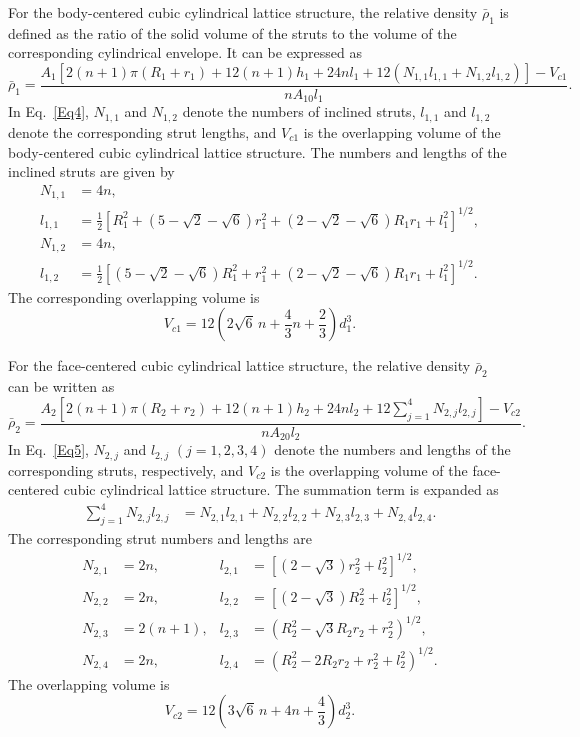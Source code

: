 \documentclass[12pt,a4paper]{article}
\begin{document}
For the body-centered cubic cylindrical lattice structure, the relative density $\bar{\rho}_1$ is defined as the ratio of the solid volume of the struts to the volume of the corresponding cylindrical envelope. It can be expressed as
%
\begin{equation}
	\bar{\rho}_1 =
	\frac{
		A_1\left[
		2(n+1)\pi(R_1+r_1)
		+12(n+1)h_1
		+24n l_1
		+12\left(N_{1,1}l_{1,1}+N_{1,2}l_{1,2}\right)
		\right]
		-V_{c1}
	}{
		nA_{10}l_1
	}.
	\label{Eq4}
\end{equation}
%
In Eq.~\eqref{Eq4}, $N_{1,1}$ and $N_{1,2}$ denote the numbers of inclined struts, $l_{1,1}$ and $l_{1,2}$ denote the corresponding strut lengths, and $V_{c1}$ is the overlapping volume of the body-centered cubic cylindrical lattice structure. The numbers and lengths of the inclined struts are given by
%
\[
\begin{aligned}
	N_{1,1} &= 4n, \\
	l_{1,1} &=
	\frac{1}{2}
	\left[
	R_1^2
	+\left(5-\sqrt{2}-\sqrt{6}\right)r_1^2
	+\left(2-\sqrt{2}-\sqrt{6}\right)R_1r_1
	+l_1^2
	\right]^{1/2}, \\[0.5em]
	N_{1,2} &= 4n, \\
	l_{1,2} &=
	\frac{1}{2}
	\left[
	\left(5-\sqrt{2}-\sqrt{6}\right)R_1^2
	+r_1^2
	+\left(2-\sqrt{2}-\sqrt{6}\right)R_1r_1
	+l_1^2
	\right]^{1/2}.
\end{aligned}
\]
%
The corresponding overlapping volume is
%
\[
V_{c1} =
12\left(2\sqrt{6}\,n+\frac{4}{3}n+\frac{2}{3}\right)d_1^3.
\]

For the face-centered cubic cylindrical lattice structure, the relative density $\bar{\rho}_2$ can be written as
%
\begin{equation}
	\bar{\rho}_2 =
	\frac{
		A_2\left[
		2(n+1)\pi(R_2+r_2)
		+12(n+1)h_2
		+24n l_2
		+12\sum_{j=1}^{4}N_{2,j}l_{2,j}
		\right]
		-V_{c2}
	}{
		nA_{20}l_2
	}.
	\label{Eq5}
\end{equation}
%
In Eq.~\eqref{Eq5}, $N_{2,j}$ and $l_{2,j}$ $(j=1,2,3,4)$ denote the numbers and lengths of the corresponding struts, respectively, and $V_{c2}$ is the overlapping volume of the face-centered cubic cylindrical lattice structure. The summation term is expanded as
%
\[
\begin{aligned}
	\sum_{j=1}^{4}N_{2,j}l_{2,j}
	&=
	N_{2,1}l_{2,1}
	+N_{2,2}l_{2,2}
	+N_{2,3}l_{2,3}
	+N_{2,4}l_{2,4}.
\end{aligned}
\]
%
The corresponding strut numbers and lengths are
%
\[
\begin{aligned}
	N_{2,1} &= 2n, &
	l_{2,1} &=
	\left[
	\left(2-\sqrt{3}\right)r_2^2+l_2^2
	\right]^{1/2}, \\[0.5em]
	N_{2,2} &= 2n, &
	l_{2,2} &=
	\left[
	\left(2-\sqrt{3}\right)R_2^2+l_2^2
	\right]^{1/2}, \\[0.5em]
	N_{2,3} &= 2(n+1), &
	l_{2,3} &=
	\left(
	R_2^2-\sqrt{3}R_2r_2+r_2^2
	\right)^{1/2}, \\[0.5em]
	N_{2,4} &= 2n, &
	l_{2,4} &=
	\left(
	R_2^2-2R_2r_2+r_2^2+l_2^2
	\right)^{1/2}.
\end{aligned}
\]
%
The overlapping volume is
%
\[
V_{c2} =
12\left(3\sqrt{6}\,n+4n+\frac{4}{3}\right)d_2^3.
\]
\end{document}
